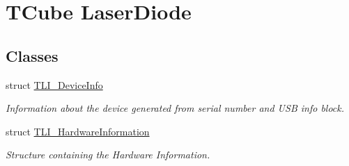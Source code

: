 \hypertarget{group___t_cube_laser_diode}{}\section{T\+Cube Laser\+Diode}
\label{group___t_cube_laser_diode}
\subsection*{Classes}
\begin{DoxyCompactItemize}
\item 
struct \hyperlink{struct_t_l_i___device_info}{T\+L\+I\+\_\+\+Device\+Info}
\begin{DoxyCompactList}\small\item\em Information about the device generated from serial number and U\+SB info block. \end{DoxyCompactList}\item 
struct \hyperlink{struct_t_l_i___hardware_information}{T\+L\+I\+\_\+\+Hardware\+Information}
\begin{DoxyCompactList}\small\item\em Structure containing the Hardware Information. \end{DoxyCompactList}\end{DoxyCompactItemize}

